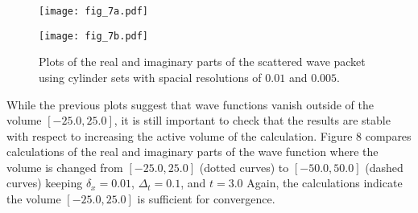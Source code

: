 \documentclass[aps,prc,reprint,noshowpacs,groupedaddress,onecolumn]{revtex4}
\begin{document}
\begin{figure}
\caption{Plots of the real and imaginary parts of the scattered
wave packet using cylinder sets with spacial resolutions of $0.01$ and $0.005$.}
\begin{minipage}[t]{.45\linewidth}
\centering
\texttt{[image: fig\_7a.pdf]}
\end{minipage}
\begin{minipage}[t]{.45\linewidth}
\centering
\texttt{[image: fig\_7b.pdf]}
\end{minipage}
\label{figure 7}
\end{figure}  

While the previous plots suggest that wave functions vanish outside of
the volume $[-25.0,25.0]$, it is still important to check that the results
are stable with respect to increasing the active volume of the
calculation.  Figure 8 compares calculations of the real and
imaginary parts of the wave function where the volume is changed from
$[-25.0,25.0]$ (dotted curves) to $[-50.0,50.0]$ (dashed curves) keeping
$\delta_x=0.01$, $\Delta_t=0.1$, and $t=3.0$ Again, the calculations
indicate the volume $[-25.0,25.0]$ is sufficient for convergence.
\end{document}
